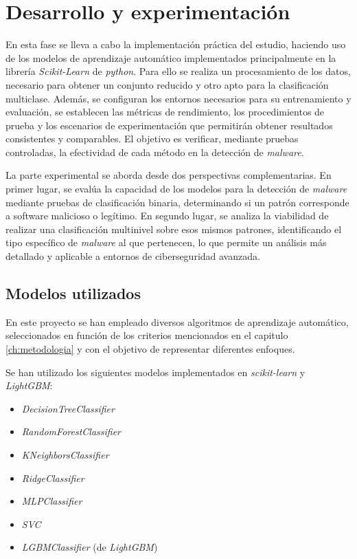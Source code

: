 \chapter{Desarrollo y experimentación}
\label{ch:desarrollo}

En esta fase se lleva a cabo la implementación práctica del estudio, haciendo uso de los modelos de aprendizaje automático implementados principalmente en la librería \textit{Scikit-Learn} de \textit{python}. Para ello se realiza un procesamiento de los datos, necesario para obtener un conjunto reducido y otro apto para la clasificación multiclase. Además, se configuran los entornos necesarios para su entrenamiento y evaluación, se establecen las métricas de rendimiento, los procedimientos de prueba y los escenarios de experimentación que permitirán obtener resultados consistentes y comparables. El objetivo es verificar, mediante pruebas controladas, la efectividad de cada método en la detección de \textit{malware}.

\vspace{1em}

La parte experimental se aborda desde dos perspectivas complementarias. En primer lugar, se evalúa la capacidad de los modelos para la detección de \textit{malware} mediante pruebas de clasificación binaria, determinando si un patrón corresponde a software malicioso o legítimo. En segundo lugar, se analiza la viabilidad de realizar una clasificación multinivel sobre esos mismos patrones, identificando el tipo específico de \textit{malware} al que pertenecen, lo que permite un análisis más detallado y aplicable a entornos de ciberseguridad avanzada.

\section{Modelos utilizados}
\label{sec:modelos_utilizados}

En este proyecto se han empleado diversos algoritmos de aprendizaje automático, seleccionados en función de los criterios mencionados en el capitulo \ref{ch:metodologia} y con el objetivo de representar diferentes enfoques.

Se han utilizado los siguientes modelos implementados en \textit{scikit-learn} y \textit{LightGBM}:

\begin{itemize}
	\item \textit{DecisionTreeClassifier}
	\item \textit{RandomForestClassifier}
	\item \textit{KNeighborsClassifier}
	\item \textit{RidgeClassifier}
	\item \textit{MLPClassifier}
	\item \textit{SVC}
	\item \textit{LGBMClassifier} (de \textit{LightGBM})
\end{itemize}

